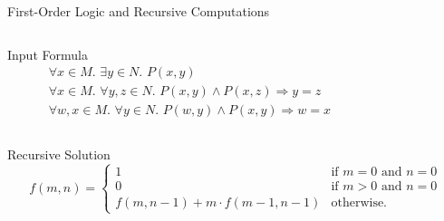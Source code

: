\documentclass{beamer}
\begin{document}
\begin{frame}{First-Order Logic and Recursive Computations}
  \begin{example}
    \begin{columns}
      \begin{column}{0.7\textwidth}
        \begin{block}{Input Formula}
          \begin{gather*}
            \forall x \in M\text{. }\exists y \in N\text{. }P(x, y) \\
            \forall x \in M\text{. }\forall y, z \in N\text{. }P(x, y) \land P(x, z) \Rightarrow y=z \\
            \forall w, x \in M\text{. }\forall y \in N\text{. }P(w, y) \land P(x, y) \Rightarrow w=x
          \end{gather*}
        \end{block}
      \end{column}
      \begin{column}{0.3\textwidth}
        \centering
      \end{column}
    \end{columns}
    \begin{block}{Recursive Solution}
    \[
      f(m, n) =
      \begin{cases}
        1 & \text{if } m = 0 \text{ and } n = 0 \\
        0 & \text{if } m > 0 \text{ and } n = 0 \\
        f(m, n-1) + m \cdot f(m-1, n-1) & \text{otherwise.}
      \end{cases}
    \]
    \end{block}
  \end{example}
\end{frame}
\end{document}
